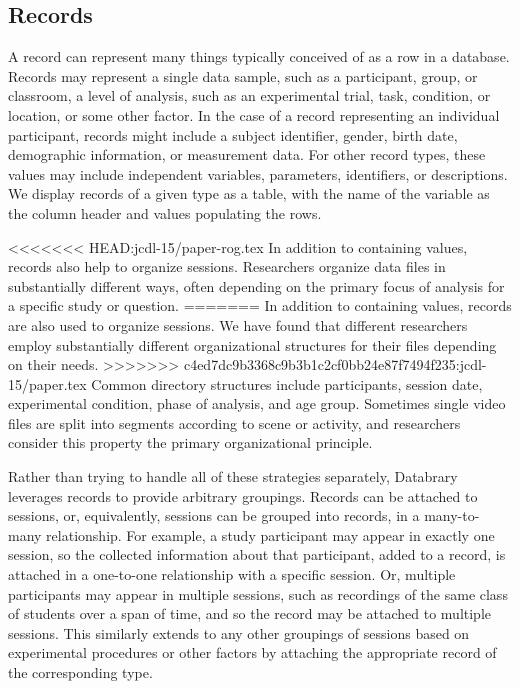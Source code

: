\documentclass{sig-alternate}
\begin{document}
\subsection{Records}

A record can represent many things typically conceived of as a row in a database.
Records may represent a single data sample, such as a participant, group, or classroom, a level of analysis, such as an experimental trial, task, condition, or location, or some other factor. 
In the case of a record representing an individual participant, records might include a subject identifier, gender, birth date, demographic information, or measurement data.
For other record types, these values may include independent variables, parameters, identifiers, or descriptions. 
We display records of a given type as a table, with the name of the variable as the column header and values populating the rows.

<<<<<<< HEAD:jcdl-15/paper-rog.tex
In addition to containing values, records also help to organize sessions.
Researchers organize data files in substantially different ways, often depending on the primary focus of analysis for a specific study or question.
=======
In addition to containing values, records are also used to organize sessions.
We have found that different researchers employ substantially different organizational structures for their files depending on their needs.
>>>>>>> c4ed7dc9b3368c9b3b1c2cf0bb24e87f7494f235:jcdl-15/paper.tex
Common directory structures include participants, session date, experimental condition, phase of analysis, and age group.
Sometimes single video files are split into segments according to scene or activity, and researchers consider this property the primary organizational principle.

Rather than trying to handle all of these strategies separately, Databrary leverages records to provide arbitrary groupings.
Records can be attached to sessions, or, equivalently, sessions can be grouped into records, in a many-to-many relationship.
For example, a study participant may appear in exactly one session, so the collected information about that participant, added to a record, is attached in a one-to-one relationship with a specific session.
Or, multiple participants may appear in multiple sessions, such as recordings of the same class of students over a span of time, and so the record may be attached to multiple sessions.
This similarly extends to any other groupings of sessions based on experimental procedures or other factors by attaching the appropriate record of the corresponding type.
\end{document}
